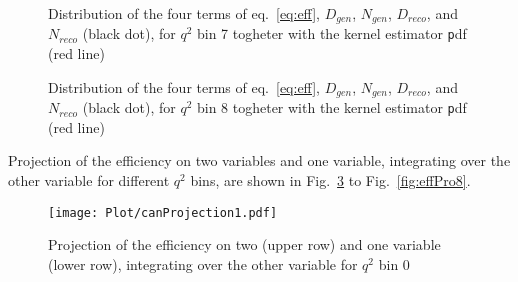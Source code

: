 \begin{figure}[hbt]




    \caption{Distribution of the four terms of eq.~\ref{eq:eff}, $D_{gen}$,
        $N_{gen}$, $D_{reco}$, and $N_{reco}$ (black dot), for $q^2$ bin 7
        togheter with the kernel estimator {\texttt pdf} (red line)}
    \label{fig:NDKde7}
\end{figure}

\begin{figure}[hbt]




    \caption{Distribution of the four terms of eq.~\ref{eq:eff}, $D_{gen}$,
        $N_{gen}$, $D_{reco}$, and $N_{reco}$ (black dot), for $q^2$ bin 8
        togheter with the kernel estimator {\texttt pdf} (red line)}
    \label{fig:NDKde8}
\end{figure}


Projection of the efficiency on two variables and one variable,
integrating over the other variable for different $q^2$ bins, are
shown in Fig.~\ref{fig:effPro0} to Fig.~\ref{fig:effPro8}.

\begin{figure}[hbt]
    \texttt{[image: Plot/canProjection1.pdf]}
    \caption{Projection of the efficiency on two (upper row) and one variable (lower row), integrating over the other variable for $q^2$ bin 0}
    \label{fig:effPro0}
\end{figure}

